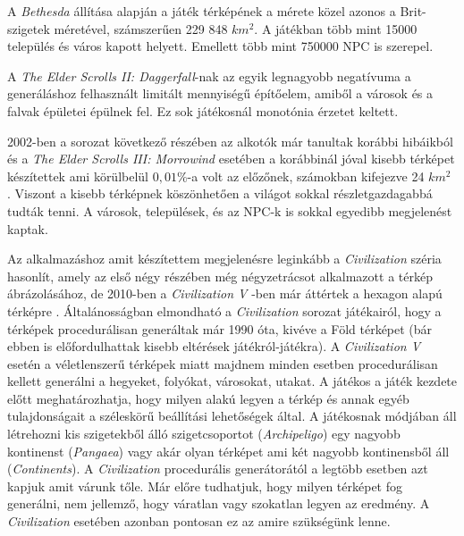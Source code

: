 A \textit{Bethesda} állítása alapján a játék térképének a mérete közel azonos a Brit-szigetek méretével, számszerűen 229 848 $km^2$. A játékban több mint 15000 település és város kapott helyett. Emellett több mint 750000 NPC is szerepel. 

A \textit{The Elder Scrolls II: Daggerfall}-nak az egyik legnagyobb negatívuma a generáláshoz felhasznált limitált mennyiségű építőelem, amiből a városok és a falvak épületei épülnek fel. Ez sok játékosnál monotónia érzetet keltett. 

2002-ben a sorozat következő részében az alkotók már tanultak korábbi hibáikból és a \textit{The Elder Scrolls III: Morrowind} esetében a korábbinál jóval kisebb térképet készítettek ami körülbelül $0,01 \%$-a volt az előzőnek, számokban kifejezve 24 $km^2$ \cite{morrowind}. Viszont a kisebb térképnek köszönhetően a világot sokkal részletgazdagabbá tudták tenni. A városok, települések, és az NPC-k is sokkal egyedibb megjelenést kaptak.

Az alkalmazáshoz amit készítettem megjelenésre leginkább a \textit{Civilization} széria hasonlít, amely az első négy részében még négyzetrácsot alkalmazott a térkép ábrázolásához, de 2010-ben a \textit{Civilization V} -ben már áttértek a hexagon alapú térképre \cite{Civilization}. Általánosságban elmondható a \textit{Civilization} sorozat játékairól, hogy a térképek procedurálisan generáltak már 1990 óta, kivéve a Föld térképet (bár ebben is előfordulhattak kisebb eltérések játékról-játékra). A \textit{Civilization V} esetén a véletlenszerű térképek miatt majdnem minden esetben procedurálisan kellett generálni a hegyeket, folyókat, városokat, utakat. A játékos a játék kezdete előtt meghatározhatja, hogy milyen alakú legyen a térkép és annak egyéb tulajdonságait a széleskörű beállítási lehetőségek által. A játékosnak módjában áll létrehozni kis szigetekből álló szigetcsoportot (\textit{Archipeligo}) egy nagyobb kontinenst (\textit{Pangaea}) vagy akár olyan térképet ami két nagyobb kontinensből áll (\textit{Continents}). A \textit{Civilization} procedurális generátorától a legtöbb esetben azt kapjuk amit várunk tőle. Már előre tudhatjuk, hogy milyen térképet fog generálni, nem jellemző, hogy váratlan vagy szokatlan legyen az eredmény. A \textit{Civilization} esetében azonban pontosan ez az amire szükségünk lenne.

